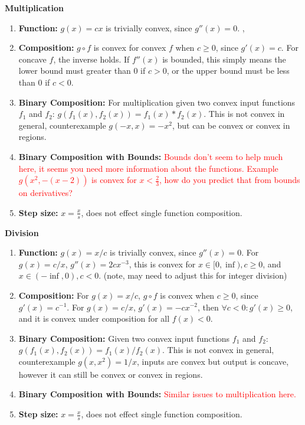 \documentclass[11pt]{article}
\theoremstyle{definition}
\newcommand{\h}[1]{\textcolor{red}{#1}}
\begin{document}
\textbf{Multiplication}
\begin{enumerate}
\item \textbf{Function:} $g(x) = cx$  is trivially convex, since $g''(x) = 0$. , 
\item \textbf{Composition:}  $g \circ f$ is convex for convex $f$ when $c \geq 0$, since $g'(x) = c$. For concave $f$, the inverse holds. If $f''(x)$ is bounded, this simply means the lower bound must greater than 0 if $c>0$, or the upper bound must be less than 0 if $c<0$.
\item \textbf{Binary Composition:} For multiplication given two convex input functions $f_1$ and $f_2$: $g(f_1(x), f_2(x)) = f_1(x) * f_2(x)$. This is not convex in general, counterexample $g(-x, x) = -x^2$, but can be convex or convex in regions.
\item \textbf{Binary Composition with Bounds:} \h{Bounds don't seem to help much here, it seems you need more information about the functions. Example $g(x^2, -(x-2))$ is convex for $x<\frac{2}{3}$, how do you predict that from bounds on derivatives?}

\item \textbf{Step size:} $x = \frac{x}{s}$, does not effect single function composition.
\end{enumerate}


\textbf{Division}
\begin{enumerate}
\item \textbf{Function:} $g(x) = x/c$  is trivially convex, since $g''(x) = 0$. For $g(x) = c/x$, $g''(x) = 2cx^{-3}$, this is convex for $x \in [0, \inf), c \geq 0$, and $x \in (-\inf, 0), c < 0$. (note, may need to adjust this for integer division)
\item \textbf{Composition:} For $g(x) = x/c$, $g \circ f$ is convex when $c \geq 0$, since $g'(x) = c^{-1}$.  For $g(x) = c/x$, $g'(x) = -cx^{-2}$, then $\forall c < 0: g'(x) \geq 0$, and it is convex under composition for all $f(x)<0$. 
\item \textbf{Binary Composition:} Given two convex input functions $f_1$ and $f_2$: $g(f_1(x), f_2(x)) = f_1(x) / f_2(x)$. This is not convex in general, counterexample $g(x, x^2) = 1/x$, inputs are convex but output is concave, however it can still be convex or convex in regions.
\item \textbf{Binary Composition with Bounds:} \h{Similar issues to multiplication here.}
\item \textbf{Step size:} $x = \frac{x}{s}$, does not effect single function composition.
\end{enumerate}
\end{document}
